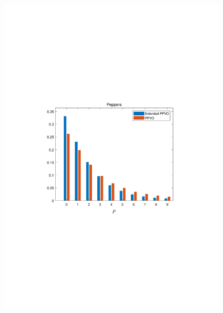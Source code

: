 \documentclass[review,3p,10pt,sort&compress]{elsarticle}
\begin{document}
\begin{figure}
{\begin{minipage}[t]{0.225\linewidth}
    \includegraphics[width=1\textwidth]{figures/Comparison/peppers.pdf}
    \end{minipage}
}
\end{figure}
\end{document}
